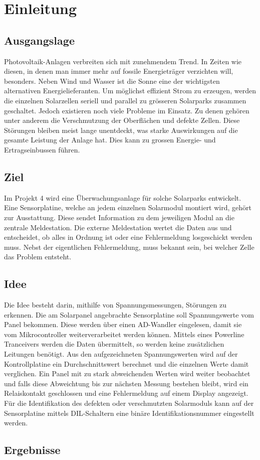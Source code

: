 \documentclass[a4paper]{fhnwreport} %
\begin{document}
\section{Einleitung}

\subsection{Ausgangslage}

Photovoltaik-Anlagen verbreiten sich mit zunehmendem Trend. In Zeiten wie diesen, in denen man immer mehr auf fossile Energieträger verzichten will, besonders. Neben Wind und Wasser ist die Sonne eine der wichtigsten alternativen Energielieferanten. Um möglichst effizient Strom zu erzeugen, werden die einzelnen Solarzellen seriell und parallel zu grösseren Solarparks zusammen geschaltet. Jedoch existieren noch viele Probleme im Einsatz. Zu denen gehören unter anderem die Verschmutzung der Oberflächen und defekte Zellen. Diese Störungen bleiben meist lange unentdeckt, was starke Auswirkungen auf die gesamte Leistung der Anlage hat. Dies kann zu grossen Energie- und Ertragseinbussen führen.

\subsection{Ziel}

Im Projekt 4 wird eine Überwachungsanlage für solche Solarparks entwickelt. Eine Sensorplatine, welche an jedem einzelnen Solarmodul montiert wird, gehört zur Ausstattung. Diese sendet Information zu dem jeweiligen Modul an die zentrale Meldestation. Die externe Meldestation wertet die Daten aus und entscheidet, ob alles in Ordnung ist oder eine Fehlermeldung losgeschickt werden muss. Nebst der eigentlichen Fehlermeldung, muss bekannt sein, bei welcher Zelle das Problem entsteht.

\subsection{Idee}

Die Idee besteht darin, mithilfe von Spannungsmessungen, Störungen zu erkennen. Die am Solarpanel angebrachte Sensorplatine soll  Spannungswerte vom Panel bekommen. Diese werden über einen AD-Wandler eingelesen, damit sie vom Mikrocontroller weiterverarbeitet werden können. Mittels eines Powerline Tranceivers werden die Daten übermittelt, so werden keine zusätzlichen Leitungen benötigt. Aus den aufgezeichneten Spannungswerten wird auf der Kontrollplatine ein Durchschnittswert berechnet und die einzelnen Werte damit verglichen. Ein Panel mit zu stark abweichenden Werten wird weiter beobachtet und falls diese Abweichtung bis zur nächsten Messung bestehen bleibt, wird ein Relaiskontakt geschlossen und eine Fehlermeldung auf einem Display angezeigt. Für die Identifikation des defekten oder verschmutzten Solarmoduls  kann auf der Sensorplatine mittels DIL-Schaltern eine binäre Identifikationsnummer eingestellt werden.

\subsection{Ergebnisse}
\end{document}
